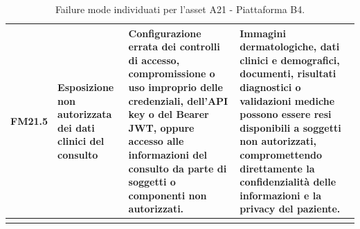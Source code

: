 {\begin{xltabular}{\textwidth}{
    >{\raggedright\arraybackslash}p{1.1cm}
    >{\raggedright\arraybackslash}p{3cm}
    >{\raggedright\arraybackslash}p{5cm}
    X
}
\midrule

FM21.5 \hypertarget{fm21-5}{} &
Esposizione non autorizzata dei dati clinici del consulto &
Configurazione errata dei controlli di accesso, compromissione o uso
improprio delle credenziali, dell'API key o del Bearer JWT, oppure
accesso alle informazioni del consulto da parte di soggetti o
componenti non autorizzati. &
Immagini dermatologiche, dati clinici e demografici, documenti,
risultati diagnostici o validazioni mediche possono essere resi
disponibili a soggetti non autorizzati, compromettendo direttamente
la confidenzialità delle informazioni e la privacy del paziente. \\

\bottomrule

\caption{Failure mode individuati per l'asset A21 - Piattaforma B4.}
\label{tab:a21-failure-modes}\\

\end{xltabular}
}

\clearpage
